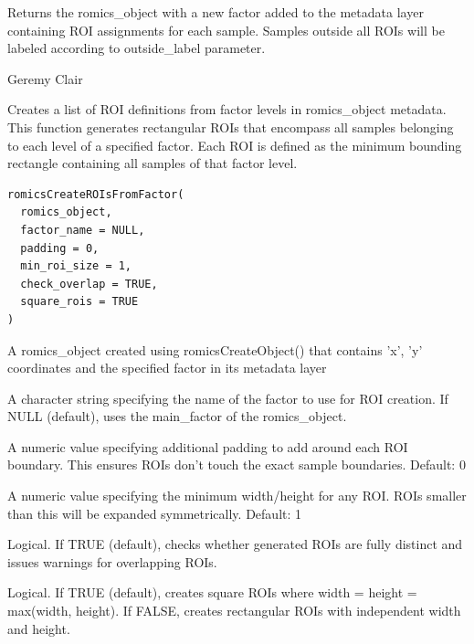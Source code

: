 \documentclass[a4paper]{book}
\begin{document}
%
\begin{Value}
Returns the romics\_object with a new factor added to the metadata layer containing
ROI assignments for each sample. Samples outside all ROIs will be labeled according
to outside\_label parameter.
\end{Value}
%
\begin{Author}
Geremy Clair
\end{Author}
%
\begin{Description}
Creates a list of ROI definitions from factor levels in romics\_object metadata.
This function generates rectangular ROIs that encompass all samples belonging to each level
of a specified factor. Each ROI is defined as the minimum bounding rectangle containing
all samples of that factor level.
\end{Description}
%
\begin{Usage}
\begin{verbatim}
romicsCreateROIsFromFactor(
  romics_object,
  factor_name = NULL,
  padding = 0,
  min_roi_size = 1,
  check_overlap = TRUE,
  square_rois = TRUE
)
\end{verbatim}
\end{Usage}
%
\begin{Arguments}
\begin{ldescription}
\item[\code{romics\_object}] A romics\_object created using romicsCreateObject() that contains 'x', 'y'
coordinates and the specified factor in its metadata layer

\item[\code{factor\_name}] A character string specifying the name of the factor to use for ROI creation.
If NULL (default), uses the main\_factor of the romics\_object.

\item[\code{padding}] A numeric value specifying additional padding to add around each ROI boundary.
This ensures ROIs don't touch the exact sample boundaries. Default: 0

\item[\code{min\_roi\_size}] A numeric value specifying the minimum width/height for any ROI.
ROIs smaller than this will be expanded symmetrically. Default: 1

\item[\code{check\_overlap}] Logical. If TRUE (default), checks whether generated ROIs are fully distinct
and issues warnings for overlapping ROIs.

\item[\code{square\_rois}] Logical. If TRUE (default), creates square ROIs where width = height = max(width, height).
If FALSE, creates rectangular ROIs with independent width and height.
\end{ldescription}
\end{Arguments}
\end{document}
